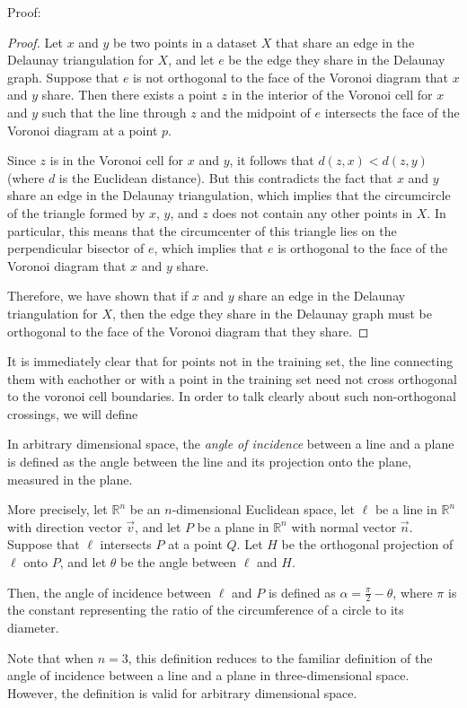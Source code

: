 Proof:
\begin{proof}
Let $x$ and $y$ be two points in a dataset $X$ that share an edge in the Delaunay triangulation for $X$, and let $e$ be the edge they share in the Delaunay graph. Suppose that $e$ is not orthogonal to the face of the Voronoi diagram that $x$ and $y$ share. Then there exists a point $z$ in the interior of the Voronoi cell for $x$ and $y$ such that the line through $z$ and the midpoint of $e$ intersects the face of the Voronoi diagram at a point $p$.

Since $z$ is in the Voronoi cell for $x$ and $y$, it follows that $d(z, x) < d(z, y)$ (where $d$ is the Euclidean distance). But this contradicts the fact that $x$ and $y$ share an edge in the Delaunay triangulation, which implies that the circumcircle of the triangle formed by $x$, $y$, and $z$ does not contain any other points in $X$. In particular, this means that the circumcenter of this triangle lies on the perpendicular bisector of $e$, which implies that $e$ is orthogonal to the face of the Voronoi diagram that $x$ and $y$ share.

Therefore, we have shown that if $x$ and $y$ share an edge in the Delaunay triangulation for $X$, then the edge they share in the Delaunay graph must be orthogonal to the face of the Voronoi diagram that they share.
\end{proof}
It is immediately clear that for points not in the training set,
the line connecting them with eachother or with a point in the
training set need not cross orthogonal to the voronoi cell
boundaries. In order to talk clearly about such non-orthogonal
crossings, we will define
\begin{definition}
In arbitrary dimensional space, the \emph{angle of incidence} between a line and a plane is defined as the angle between the line and its projection onto the plane, measured in the plane.

More precisely, let $\mathbb{R}^n$ be an $n$-dimensional Euclidean space, let $\ell$ be a line in $\mathbb{R}^n$ with direction vector $\vec{v}$, and let $P$ be a plane in $\mathbb{R}^n$ with normal vector $\vec{n}$. Suppose that $\ell$ intersects $P$ at a point $Q$. Let $H$ be the orthogonal projection of $\ell$ onto $P$, and let $\theta$ be the angle between $\ell$ and $H$.

Then, the angle of incidence between $\ell$ and $P$ is defined as $\alpha = \frac{\pi}{2} - \theta$, where $\pi$ is the constant representing the ratio of the circumference of a circle to its diameter.

Note that when $n=3$, this definition reduces to the familiar definition of the angle of incidence between a line and a plane in three-dimensional space. However, the definition is valid for arbitrary dimensional space.
\end{definition}

